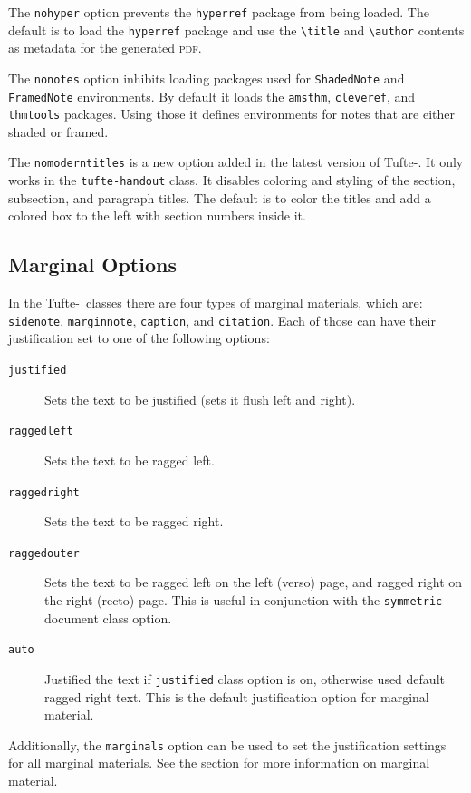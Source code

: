 \documentclass[a4paper]{tufte-handout}
\newcommand{\TL}{Tufte-\hologo{LaTeX}\xspace}
\newcommand{\hlorange}[1]{\textcolor{tufte-orange}{#1}}
\newcommand{\doccmd}[1]{\hlorange{\texttt{\textbackslash#1}}}
\newcommand{\docenv}[1]{\hlorange{\texttt{#1}}}
\newcommand{\docpkg}[1]{\hlorange{\texttt{#1}}}
\newcommand{\doccls}[1]{\texttt{#1}}
\newcommand{\docclsopt}[1]{\hlorange{\texttt{#1}}}
\begin{document}
The \docclsopt{nohyper} option prevents the \docpkg{hyperref} package from being loaded.
The default is to load the \docpkg{hyperref} package and use the \doccmd{title} and \doccmd{author} contents as metadata for the generated \textsc{pdf}.

The \docclsopt{nonotes} option inhibits loading packages used for \docenv{ShadedNote} and \docenv{FramedNote} environments.
By default it loads the \docpkg{amsthm}, \docpkg{cleveref}, and \docpkg{thmtools} packages.
Using those it defines environments for notes that are either shaded or framed.

The \docclsopt{nomoderntitles} is a new option added in the latest version of \TL.
It only works in the \doccls{tufte-handout} class.
It disables coloring and styling of the section, subsection, and paragraph titles.
The default is to color the titles and add a colored box to the left with section numbers inside it.

\subsection{Marginal Options}\label{ssec:marginal-options}
In the \TL\ classes there are four types of marginal materials, which are:
\docclsopt{sidenote}, \docclsopt{marginnote}, \docclsopt{caption}, and \docclsopt{citation}.
Each of those can have their justification set to one of the following options:
\begin{description}
  \item[\docclsopt{justified}] Sets the text to be justified (sets it flush left and right).
  \item[\docclsopt{raggedleft}] Sets the text to be ragged left.
  \item[\docclsopt{raggedright}] Sets the text to be ragged right.
  \item[\docclsopt{raggedouter}] Sets the text to be ragged left on the left (verso) page, and ragged right on the right (recto) page.
  This is useful in conjunction with the \docclsopt{symmetric} document class option.
  \item[\docclsopt{auto}] Justified the text if \docclsopt{justified} class option is on, otherwise used default ragged right text.
  This is the default justification option for marginal material.
\end{description}

Additionally, the \docclsopt{marginals} option can be used to set the justification settings for all marginal materials.
See the  section for more information on marginal material.
\end{document}
